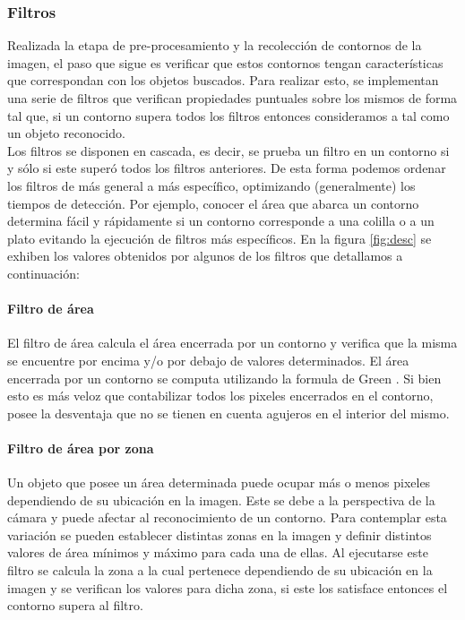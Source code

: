 	

	\subsubsection{\label{sec:filtros} Filtros}
	Realizada la etapa de pre-procesamiento y la recolecci\'on de contornos 
	de la imagen, el paso que sigue es verificar que estos
	contornos tengan caracter\'isticas que correspondan con  los 
	objetos buscados. Para realizar esto, se implementan una serie de filtros que verifican propiedades
	puntuales sobre los mismos de forma tal que, si un contorno supera todos los filtros entonces consideramos a tal como un objeto reconocido. \\
	\indent Los filtros se disponen en cascada, es decir, se prueba un 
	filtro en un contorno si y s\'olo si este super\'o todos los filtros 
	anteriores. De esta forma podemos ordenar los filtros de m\'as general 
	a m\'as espec\'ifico, optimizando (generalmente) los tiempos de detecci\'on. Por ejemplo, conocer 
	el \'area que abarca un contorno determina f\'acil y r\'apidamente si un contorno corresponde a una colilla o a un plato evitando la ejecuci\'on
	de filtros m\'as espec\'ificos. En la figura \ref{fig:desc} se exhiben 
	los valores obtenidos por algunos de los filtros que detallamos a 
	continuaci\'on:
	\paragraph{Filtro de \'area}
	El filtro de \'area calcula el \'area encerrada por un contorno y verifica que la misma se encuentre por encima y/o por debajo
	de valores determinados. El \'area encerrada por un contorno se computa utilizando la formula de Green \cite{greenwolfram}.
	Si bien esto es m\'as veloz que contabilizar todos los pixeles encerrados en el contorno, posee la desventaja que no se tienen en cuenta agujeros
	en el interior del mismo.
	\paragraph{Filtro de \'area por zona}
	Un objeto que posee un \'area determinada puede ocupar m\'as o menos pixeles dependiendo de su ubicaci\'on en la imagen. Este se debe a la 
	perspectiva de la c\'amara y puede afectar al reconocimiento de un contorno. Para contemplar esta variaci\'on se pueden establecer distintas
	zonas en la imagen y definir distintos valores de \'area m\'inimos y m\'aximo para cada una de ellas. Al ejecutarse este filtro se calcula la
	zona a la cual pertenece dependiendo de su ubicaci\'on en la imagen y se verifican los valores para dicha zona, si este los satisface entonces
	el contorno supera al filtro.
